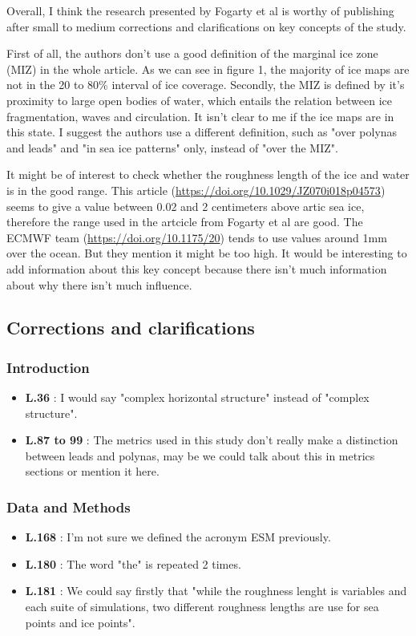 \documentclass[10pt]{article}
\numberwithin{equation}{section}
\begin{document}
Overall, I think the research presented by Fogarty et al is worthy of publishing after small to medium corrections and clarifications on key concepts of the study.\bigskip

First of all, the authors don't use a good definition of the marginal ice zone (MIZ) in the whole article. As we can see in figure 1, the majority of ice maps are not in the 20 to 80\% interval of ice coverage. Secondly, the MIZ is defined by it's proximity to large open bodies of water, which entails the relation between ice fragmentation, waves and circulation. It isn't clear to me if the ice maps are in this state. I suggest the authors use a different definition, such as "over polynas and leads" and "in sea ice patterns" only, instead of "over the MIZ".\bigskip

It might be of interest to check whether the roughness length of the ice and water is in the good range. This article (\url{https://doi.org/10.1029/JZ070i018p04573}) seems to give a value between 0.02 and 2 centimeters above artic sea ice, therefore the range used in the artcicle from Fogarty et al are good. The ECMWF team (\url{https://doi.org/10.1175/20}) tends to use values around 1mm over the ocean. But they mention it might be too high. It would be interesting to add information about this key concept because there isn't much information about why there isn't much influence. 
\subsection{Corrections and clarifications}
\label{sec:org4657633}

\subsubsection{Introduction}
\label{sec:org8bdbba5}
\begin{itemize}
\item \textbf{L.36} : I would say "complex horizontal structure" instead of "complex structure".
\item \textbf{L.87 to 99} : The metrics used in this study don't really make a distinction between leads and polynas, may be we could talk about this in metrics sections or mention it here.
\end{itemize}
\subsubsection{Data and Methods}
\label{sec:org3137f57}
\begin{itemize}
\item \textbf{L.168} : I'm not sure we defined the acronym ESM previously.
\item \textbf{L.180} : The word "the" is repeated 2 times.
\item \textbf{L.181} : We could say firstly that "while the roughness lenght is variables and each suite of simulations, two different roughness lengths are use for sea points and ice points".
\end{itemize}
\end{document}
